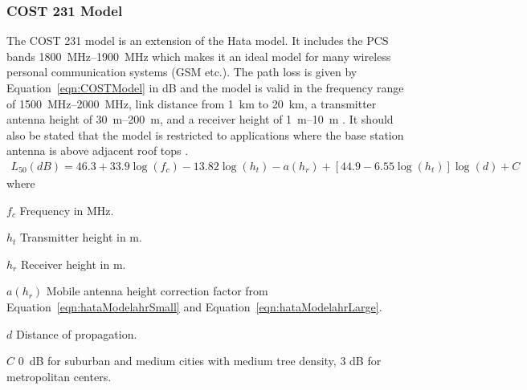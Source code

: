 \subsubsection{COST 231 Model}
The COST 231 model is an extension of the Hata model. It includes the PCS bands \SIrange{1800}{1900}{MHz} which makes it an ideal model for many wireless personal communication systems (GSM etc.). The path loss is given by Equation~\ref{eqn:COSTModel} in dB \cite{Seybold2005introduction} and the model is valid in the frequency range of  \SIrange{1500}{2000}{MHz}, link distance from \SI{1}{km} to \SI{20}{km}, a transmitter antenna height of \SIrange{30}{200}{m}, and a receiver height of \SIrange{1}{10}{m} \cite{Seybold2005introduction}. It should also be stated that the model is restricted to applications where the base station antenna is above adjacent roof tops \cite{itu2002report}.
\begin{align} 
    \label{eqn:COSTModel} %
    L_{50}(dB) = 46.3+33.9 \log(f_c)-13.82 \log(h_t)-a(h_r)+[44.9-6.55 \log(h_t)] \log(d) + C 
\end{align} 
where 
\begin{where}
\item [$f_c$] Frequency in \si{MHz}.
\item [$h_t$] Transmitter height in \si{m}. 
\item [$h_r$] Receiver height in \si{m}.
\item [$a(h_r)$] Mobile antenna height correction factor from Equation~\ref{eqn:hataModelahrSmall} and Equation~\ref{eqn:hataModelahrLarge}.
\item [$d$] Distance of propagation.
\item [$C$] \SI{0}{dB} for suburban and medium cities with medium tree density, 3 dB for metropolitan centers. 
\end{where}

